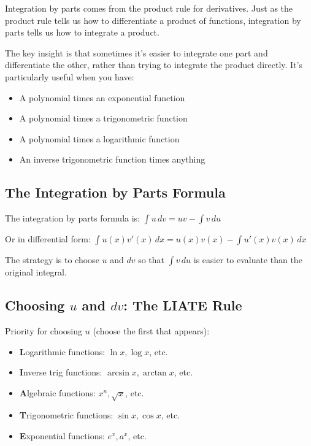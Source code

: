 \documentclass[12pt,a4paper]{book}
\theoremstyle{definition}
\begin{document}
\begin{intuition}
Integration by parts comes from the product rule for derivatives. Just as the product rule tells us how to differentiate a product of functions, integration by parts tells us how to integrate a product.

The key insight is that sometimes it's easier to integrate one part and differentiate the other, rather than trying to integrate the product directly. It's particularly useful when you have:
\begin{itemize}
    \item A polynomial times an exponential function
    \item A polynomial times a trigonometric function
    \item A polynomial times a logarithmic function
    \item An inverse trigonometric function times anything
\end{itemize}
\end{intuition}

\subsection{The Integration by Parts Formula}

\begin{keyformula}
The integration by parts formula is:
$\int u \, dv = uv - \int v \, du$

Or in differential form:
$\int u(x)v'(x) \, dx = u(x)v(x) - \int u'(x)v(x) \, dx$

The strategy is to choose $u$ and $dv$ so that $\int v \, du$ is easier to evaluate than the original integral.
\end{keyformula}

\subsection{Choosing $u$ and $dv$: The LIATE Rule}

\begin{keyformula}
Priority for choosing $u$ (choose the first that appears):
\begin{itemize}
    \item \textbf{L}ogarithmic functions: $\ln x, \log x$, etc.
    \item \textbf{I}nverse trig functions: $\arcsin x, \arctan x$, etc.
    \item \textbf{A}lgebraic functions: $x^n, \sqrt{x}$, etc.
    \item \textbf{T}rigonometric functions: $\sin x, \cos x$, etc.
    \item \textbf{E}xponential functions: $e^x, a^x$, etc.
\end{itemize}
\end{keyformula}
\end{document}
